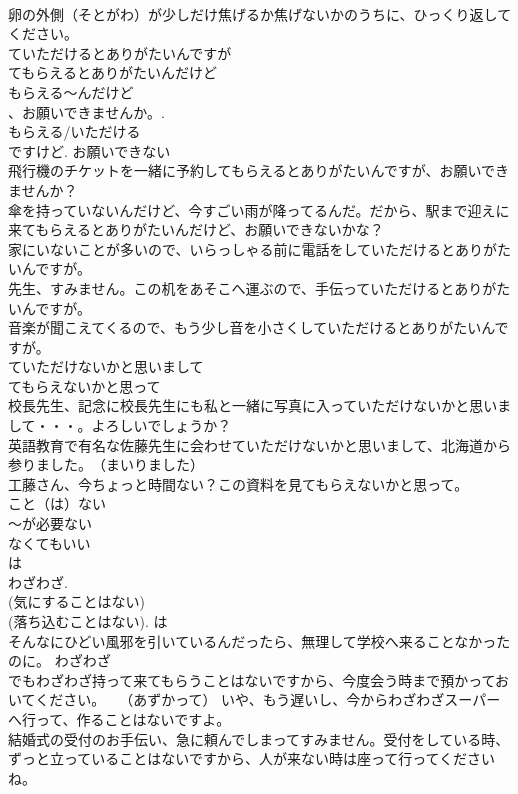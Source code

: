 \documentclass[8pt]{extreport}
\begin{document}
\begin{CJK}{UTF8}{min}
\\	卵の外側（そとがわ）が少しだけ焦げるか焦げないかのうちに、ひっくり返してください。
\\	ていただけるとありがたいんですが 
\\	てもらえるとありがたいんだけど	
\\	もらえる～んだけど 
\\	、お願いできませんか。. 
\\	もらえる/いただける 
\\	ですけど. お願いできない 
\\	飛行機のチケットを一緒に予約してもらえるとありがたいんですが、お願いできませんか？ 
\\	傘を持っていないんだけど、今すごい雨が降ってるんだ。だから、駅まで迎えに来てもらえるとありがたいんだけど、お願いできないかな？ 
\\	家にいないことが多いので、いらっしゃる前に電話をしていただけるとありがたいんですが。 
\\	先生、すみません。この机をあそこへ運ぶので、手伝っていただけるとありがたいんですが。 
\\	音楽が聞こえてくるので、もう少し音を小さくしていただけるとありがたいんですが。 
\\	ていただけないかと思いまして 
\\	てもらえないかと思って 
\\	校長先生、記念に校長先生にも私と一緒に写真に入っていただけないかと思いまして・・・。よろしいでしょうか？ 
\\	英語教育で有名な佐藤先生に会わせていただけないかと思いまして、北海道から参りました。　（まいりました） 
\\	工藤さん、今ちょっと時間ない？この資料を見てもらえないかと思って。 
\\	こと（は）ない	
\\	～が必要ない 
\\	なくてもいい 
\\	は 
\\	わざわざ. 
\\	(気にすることはない) 
\\	(落ち込むことはない). は 
\\	そんなにひどい風邪を引いているんだったら、無理して学校へ来ることなかったのに。 わざわざ 
\\	でもわざわざ持って来てもらうことはないですから、今度会う時まで預かっておいてください。　　（あずかって） いや、もう遅いし、今からわざわざスーパーへ行って、作ることはないですよ。 
\\	結婚式の受付のお手伝い、急に頼んでしまってすみません。受付をしている時、ずっと立っていることはないですから、人が来ない時は座って行ってくださいね。 

\end{CJK}
\end{document}
